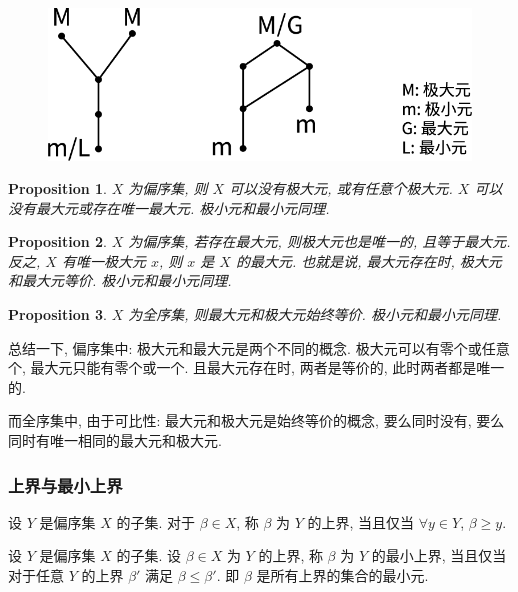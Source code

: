 \documentclass[UTF8]{ctexart}
\theoremstyle{mystyle}
\newtheorem{proposition}{Proposition}[section]
\theoremstyle{myremark}
\theoremstyle{plain}
\begin{document}
\begin{figure}[H]
    \centering
    \includegraphics[width = 0.6\linewidth]{./images/maximal_greatest.png}
\end{figure} 

\begin{proposition}
    $ X $ 为偏序集, 则 $ X $ 可以没有极大元, 或有任意个极大元. $ X $ 可以没有最大元或存在唯一最大元. 极小元和最小元同理.
\end{proposition}


\begin{proposition}
    $ X $ 为偏序集, 若存在最大元, 则极大元也是唯一的, 且等于最大元. 反之, $ X $ 有唯一极大元 $ x $, 则 $ x $ 是 $ X $ 的最大元. 也就是说, 最大元存在时, 极大元和最大元等价. 极小元和最小元同理.
\end{proposition}

\begin{proposition}
    $ X $ 为全序集, 则最大元和极大元始终等价. 极小元和最小元同理.
\end{proposition}

总结一下, 偏序集中: 极大元和最大元是两个不同的概念. 极大元可以有零个或任意个, 最大元只能有零个或一个. 且最大元存在时, 两者是等价的, 此时两者都是唯一的.

而全序集中, 由于可比性: 最大元和极大元是始终等价的概念, 要么同时没有, 要么同时有唯一相同的最大元和极大元.

\subsubsection{上界与最小上界}
\begin{definition}
    设 $ Y $ 是偏序集 $ X $ 的子集. 对于 $ \beta \in X $, 称 $ \beta $ 为 $ Y $ 的上界, 当且仅当 $ \forall y \in Y $, $ \beta \ge y $.
\end{definition}

\begin{definition}
    设 $ Y $ 是偏序集 $ X $ 的子集. 设 $ \beta \in X $ 为 $ Y $ 的上界, 称 $ \beta $ 为 $ Y $ 的最小上界, 当且仅当对于任意 $ Y $ 的上界 $ \beta' $ 满足 $ \beta \le \beta' $. 即 $ \beta $ 是所有上界的集合的最小元.
\end{definition}
\end{document}

